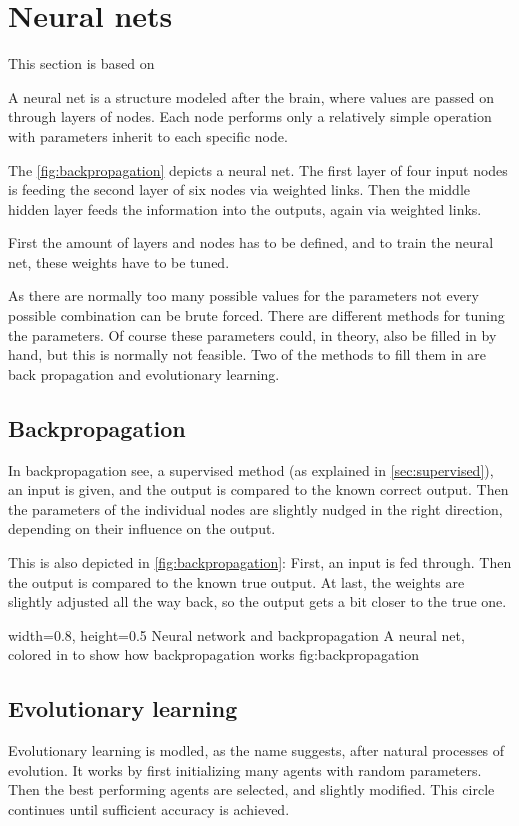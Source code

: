 \section{Neural nets} 
\label{sec:NN}
This section is based on \cite[p. 727f]{MA}

A neural net is a structure modeled after the brain, where values are passed on through layers of nodes. Each node performs only a relatively simple operation with parameters inherit to each specific node.

The \autoref{fig:backpropagation} depicts a neural net. The first layer of four input nodes is feeding the second layer of six nodes via weighted links. Then the middle hidden layer feeds the information into the outputs, again via weighted links.

First the amount of layers and nodes has to be defined, and to train the neural net, these weights have to be tuned.

As there are normally too many possible values for the parameters not every possible combination can be brute forced. There are different methods for tuning the parameters. Of course these parameters could, in theory, also be filled in by hand, but this is normally not feasible. Two of the methods to fill them in are back propagation and evolutionary learning.

\subsection{Backpropagation}
In backpropagation see, a supervised method (as explained in \autoref{sec:supervised}), an input is given, and the output is compared to the known correct output. Then the parameters of the individual nodes are slightly nudged in the right direction, depending on their influence on the output. 

This is also depicted in \autoref{fig:backpropagation}: First, an input is fed through. Then the output is compared to the known true output. At last, the weights are slightly adjusted all the way back, so the output gets a bit closer to the true one.

    {width=0.8\textwidth, height=0.5\textheight} %
    {Neural network and backpropagation}   %
    {A neural net, colored in to show how backpropagation works}   %
    {fig:backpropagation}    %
    
\subsection{Evolutionary learning}
Evolutionary learning is modled, as the name suggests, after natural processes of evolution. It works by first initializing many agents with random parameters. Then the best performing agents are selected, and slightly modified. This circle continues until sufficient accuracy is achieved.